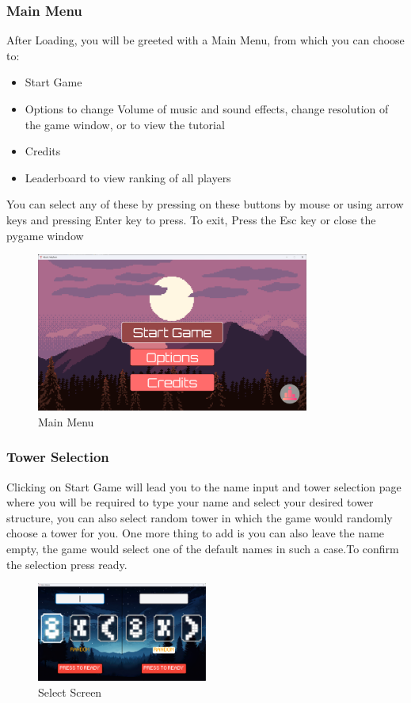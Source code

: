 \documentclass[10.5pt]{article}
\begin{document}
\subsubsection{Main Menu}
After Loading, you will be greeted with a Main Menu, from which you can choose to:
    \begin{itemize}
        \item Start Game
        \item Options to change Volume of music and sound effects, change resolution of the game window, or to view the tutorial
        \item Credits
        \item Leaderboard to view ranking of all players
    \end{itemize}
    You can select any of these by pressing on these buttons by mouse or using arrow keys and pressing Enter key to press. To exit, Press the Esc key or close the pygame window
    \vspace{0.2cm}
    \begin{figure}[h!]
        \centering
        \includegraphics[width=0.8\textwidth]{mainmenu.png}
        \caption{Main Menu}
        \label{fig:MainMenu}
    \end{figure}

\newpage

\subsubsection{Tower Selection}
Clicking on Start Game will lead you to the name input and tower selection page where you will be required to type your name and select your desired tower structure, you can also select random tower in which the game would randomly choose a tower for you. One more thing to add is you can also leave the name empty, the game would select one of the default names in such a case.To confirm the selection press ready.
    \begin{figure}[h!]
        \centering
        \includegraphics[width=0.5\textwidth]{select.png}
        \caption{Select Screen}\label{fig:select}
    \end{figure}
\end{document}
